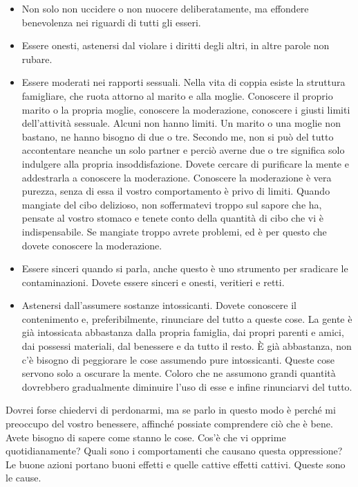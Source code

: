 \begin{itemize}

\item Non solo non uccidere o non nuocere deliberatamente, ma effondere
  benevolenza nei riguardi di tutti gli esseri.

\item Essere onesti, astenersi dal violare i diritti degli altri, in altre
  parole non rubare.

\item Essere moderati nei rapporti sessuali. Nella vita di coppia esiste la
  struttura famigliare, che ruota attorno al marito e alla moglie. Conoscere il
  proprio marito o la propria moglie, conoscere la moderazione, conoscere i
  giusti limiti dell'attività sessuale. Alcuni non hanno limiti. Un marito o una
  moglie non bastano, ne hanno bisogno di due o tre. Secondo me, non si può del
  tutto accontentare neanche un solo partner e perciò averne due o tre significa
  solo indulgere alla propria insoddisfazione. Dovete cercare di purificare la
  mente e addestrarla a conoscere la moderazione. Conoscere la moderazione è
  vera purezza, senza di essa il vostro comportamento è privo di limiti. Quando
  mangiate del cibo delizioso, non soffermatevi troppo sul sapore che ha,
  pensate al vostro stomaco e tenete conto della quantità di cibo che vi è
  indispensabile. Se mangiate troppo avrete problemi, ed è per questo che dovete
  conoscere la moderazione.

\item Essere sinceri quando si parla, anche questo è uno strumento per sradicare
  le contaminazioni. Dovete essere sinceri e onesti, veritieri e retti.

\item Astenersi dall'assumere sostanze intossicanti. Dovete conoscere il
  contenimento e, preferibilmente, rinunciare del tutto a queste cose. La gente
  è già intossicata abbastanza dalla propria famiglia, dai propri parenti e
  amici, dai possessi materiali, dal benessere e da tutto il resto. È già
  abbastanza, non c'è bisogno di peggiorare le cose assumendo pure intossicanti.
  Queste cose servono solo a oscurare la mente. Coloro che ne assumono grandi
  quantità dovrebbero gradualmente diminuire l'uso di esse e infine rinunciarvi
  del tutto.

\end{itemize}

Dovrei forse chiedervi di perdonarmi, ma se parlo in questo modo è
perché mi preoccupo del vostro benessere, affinché possiate comprendere
ciò che è bene. Avete bisogno di sapere come stanno le cose. Cos'è che
vi opprime quotidianamente? Quali sono i comportamenti che causano
questa oppressione? Le buone azioni portano buoni effetti e quelle
cattive effetti cattivi. Queste sono le cause.

